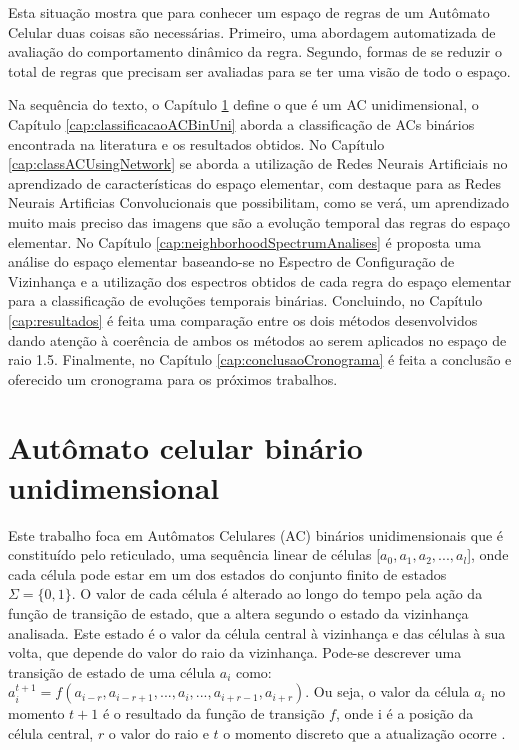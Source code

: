 \documentclass[12pt,a4paper]{report}
\begin{document}
	Esta situação mostra que para conhecer um espaço de regras de um Autômato Celular duas coisas são necessárias. Primeiro, uma abordagem automatizada de avaliação do comportamento dinâmico da regra. Segundo, formas de se reduzir o total de regras que precisam ser avaliadas para se ter uma visão de todo o espaço.
	
	Na sequência do texto, o Capítulo \ref{automatoCelularBinarioUnidimensional} define o que é um AC unidimensional, o Capítulo \ref{cap:classificacaoACBinUni} aborda a classificação de ACs binários encontrada na literatura e os resultados obtidos. No Capítulo \ref{cap:classACUsingNetwork} se aborda a utilização de Redes Neurais Artificiais no aprendizado de características do espaço elementar, com destaque para as Redes Neurais Artificias Convolucionais que possibilitam, como se verá, um aprendizado muito mais preciso das imagens que são a evolução temporal das regras do espaço elementar. No Capítulo \ref{cap:neighborhoodSpectrumAnalises} é proposta uma análise do espaço elementar baseando-se no Espectro de Configuração de Vizinhança e a utilização dos espectros obtidos de cada regra do espaço elementar para a classificação de evoluções temporais binárias. Concluindo, no Capítulo \ref{cap:resultados} é feita uma comparação entre os dois métodos desenvolvidos dando atenção à coerência de ambos os métodos ao serem aplicados no espaço de raio 1.5. Finalmente, no Capítulo \ref{cap:conclusaoCronograma} é feita a conclusão e oferecido um cronograma para os próximos trabalhos.
	
	
	\chapter{Autômato celular binário unidimensional}
	\label{automatoCelularBinarioUnidimensional}
	
	Este trabalho foca em Autômatos Celulares (AC) binários unidimensionais que é constituído pelo reticulado, uma sequência linear de células [$a_0,a_1,a_2,...,a_l$], onde cada célula pode estar em um dos estados do conjunto finito de estados $\Sigma=\{0,1\}$. O valor de cada célula é alterado ao longo do tempo pela ação da função de transição de estado, que a altera segundo o estado da vizinhança analisada. Este estado é o valor da célula central à vizinhança e das células à sua volta, que depende do valor do raio da vizinhança. Pode-se descrever uma transição de estado de uma célula $a_i$ como: $a^{t+1}_i=f(a_{i-r},a_{i-r+1},...,a_i,...,a_{i+r-1},a_{i+r})$. Ou seja, o valor da célula $a_i$ no momento $t+1$ é o resultado da função de transição $f$, onde i é a posição da célula central, $r$ o valor do raio e $t$ o momento discreto que a atualização ocorre \cite{Wolfram1984}.
	
\end{document}
